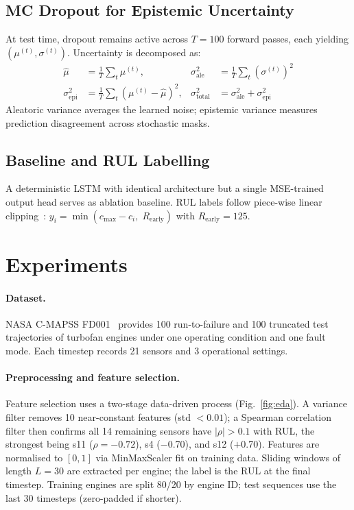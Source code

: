 \documentclass[runningheads]{llncs}
\begin{document}
\subsection{MC Dropout for Epistemic Uncertainty}
At test time, dropout remains active across $T{=}100$ forward passes, each yielding $(\mu^{(t)}, \sigma^{(t)})$.
Uncertainty is decomposed as:
\begin{align}
    \hat{\mu} &= \tfrac{1}{T}\textstyle\sum_t \mu^{(t)}, &
    \sigma^2_{\text{ale}} &= \tfrac{1}{T}\textstyle\sum_t (\sigma^{(t)})^2  \label{eq:ale} \\
    \sigma^2_{\text{epi}} &= \tfrac{1}{T}\textstyle\sum_t (\mu^{(t)} {-} \hat{\mu})^2, &
    \sigma^2_{\text{total}} &= \sigma^2_{\text{ale}} + \sigma^2_{\text{epi}}  \label{eq:total}
\end{align}
Aleatoric variance averages the learned noise; epistemic variance measures prediction disagreement across stochastic masks.

\subsection{Baseline and RUL Labelling}
A deterministic LSTM with identical architecture but a single MSE-trained output head serves as ablation baseline.
RUL labels follow piece-wise linear clipping~\cite{heimes2008recurrent}: $y_i = \min(c_{\max} - c_i,\; R_{\text{early}})$ with $R_{\text{early}}{=}125$.

\section{Experiments}
\label{sec:experiments}

\paragraph{Dataset.}
NASA C-MAPSS FD001~\cite{saxena2008damage} provides 100 run-to-failure and 100 truncated test trajectories of turbofan engines under one operating condition and one fault mode.
Each timestep records 21 sensors and 3 operational settings.

\paragraph{Preprocessing and feature selection.}
Feature selection uses a two-stage data-driven process (Fig.~\ref{fig:eda}).
A variance filter removes 10 near-constant features (std $< 0.01$); a Spearman correlation filter then confirms all 14 remaining sensors have $|\rho|{>}0.1$ with RUL, the strongest being s11 ($\rho{=}{-}0.72$), s4 ($-$0.70), and s12 ($+$0.70).
Features are normalised to $[0,1]$ via MinMaxScaler fit on training data.
Sliding windows of length $L{=}30$ are extracted per engine; the label is the RUL at the final timestep.
Training engines are split 80/20 by engine ID; test sequences use the last 30 timesteps (zero-padded if shorter).
\end{document}
